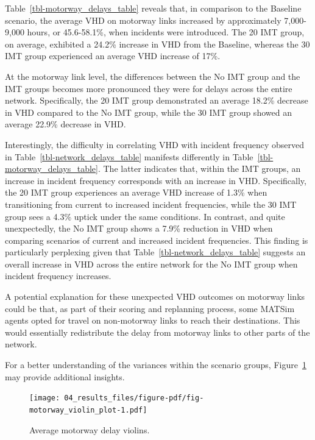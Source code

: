 \documentclass[fancy, oneside, mastersfancy, ms]{byuthesis}
\begin{document}
Table~\ref{tbl-motorway_delays_table} reveals that, in comparison to the
Baseline scenario, the average VHD on motorway links increased by
approximately 7,000-9,000 hours, or 45.6-58.1\%, when incidents were
introduced. The 20 IMT group, on average, exhibited a 24.2\% increase in
VHD from the Baseline, whereas the 30 IMT group experienced an average
VHD increase of 17\%.

At the motorway link level, the differences between the No IMT group and
the IMT groups becomes more pronounced they were for delays across the
entire network. Specifically, the 20 IMT group demonstrated an average
18.2\% decrease in VHD compared to the No IMT group, while the 30 IMT
group showed an average 22.9\% decrease in VHD.

Interestingly, the difficulty in correlating VHD with incident frequency
observed in Table~\ref{tbl-network_delays_table} manifests differently
in Table~\ref{tbl-motorway_delays_table}. The latter indicates that,
within the IMT groups, an increase in incident frequency corresponds
with an increase in VHD. Specifically, the 20 IMT group experiences an
average VHD increase of 1.3\% when transitioning from current to
increased incident frequencies, while the 30 IMT group sees a 4.3\%
uptick under the same conditions. In contrast, and quite unexpectedly,
the No IMT group shows a 7.9\% reduction in VHD when comparing scenarios
of current and increased incident frequencies. This finding is
particularly perplexing given that Table~\ref{tbl-network_delays_table}
suggests an overall increase in VHD across the entire network for the No
IMT group when incident frequency increases.

A potential explanation for these unexpected VHD outcomes on motorway
links could be that, as part of their scoring and replanning process,
some MATSim agents opted for travel on non-motorway links to reach their
destinations. This would essentially redistribute the delay from
motorway links to other parts of the network.

For a better understanding of the variances within the scenario groups,
Figure~\ref{fig-motorway_violin_plot} may provide additional insights.

\begin{figure}

{\centering \texttt{[image: 04\_results\_files/figure-pdf/fig-motorway\_violin\_plot-1.pdf]}

}

\caption{\label{fig-motorway_violin_plot}Average motorway delay
violins.}

\end{figure}
\end{document}
